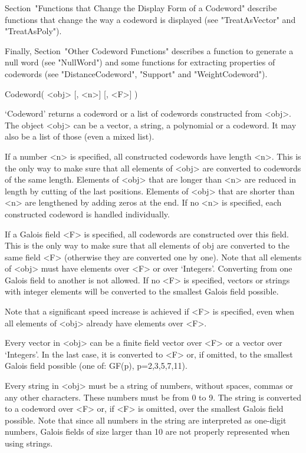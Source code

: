 Section~"Functions that Change the Display Form of a  Codeword"  describe
functions  that  change  the   way   a   codeword   is   displayed   (see
"TreatAsVector" and "TreatAsPoly").

Finally, Section~"Other  Codeword  Functions"  describes  a  function  to
generate a null word (see "NullWord") and some functions  for  extracting
properties  of   codewords   (see   "DistanceCodeword",   "Support"   and
"WeightCodeword").


\>Codeword( <obj> [, <n>] [, <F>] )

`Codeword' returns  a codeword  or a list  of codewords  constructed from
<obj>.  The object <obj>  can be a vector,  a  string, a polynomial or  a
codeword. It may also be a list of those (even a mixed list).

If a number  <n> is   specified, all  constructed codewords  have  length
<n>. This  is the only  way to make sure that  all  elements of <obj> are
converted  to  codewords of the same  length.  Elements of <obj> that are
longer   than <n>  are   reduced in   length  by  cutting  of the    last
positions. Elements of <obj> that are  shorter than <n> are lengthened by
adding zeros  at  the  end.  If no  <n>  is specified,  each  constructed
codeword is handled individually.

If a  Galois field <F>  is specified, all  codewords are constructed over
this field. This is the  only way to  make sure that  all elements of obj
are converted to the same field <F> (otherwise they  are converted one by
one). Note that all elements of <obj> must have elements over <F> or over
`Integers'.   Converting  from  one  Galois    field to another    is not
allowed. If no <F> is specified, vectors or strings with integer elements
will be converted to the smallest Galois field possible.

Note that a significant speed  increase is achieved  if <F> is specified,
even when all elements of <obj> already have elements over <F>.

Every vector in <obj> can be a  finite field vector over  <F> or a vector
over `Integers'. In the last case, it is converted to <F> or, if omitted,
to the smallest Galois field possible (one of: GF(p), p=2,3,5,7,11).

Every string in <obj> must be a string of numbers, without spaces, commas
or any other characters. These numbers must be from 0 to 9. The string is
converted to a codeword over <F> or, if <F> is omitted, over the smallest
Galois  field  possible. Note that since  all  numbers in  the string are
interpreted as one-digit  numbers, Galois fields of  size larger than  10
are not properly represented when using strings.

